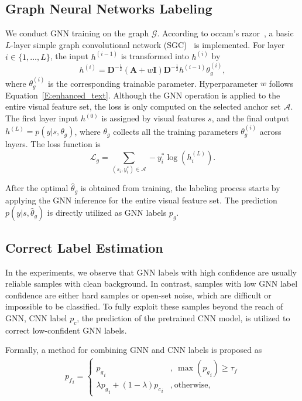 \documentclass[sigconf]{acmart}
\begin{document}
	\subsection{Graph Neural Networks Labeling}
	\label{S:gnn}
	We conduct GNN training on the graph $\mathcal{G}$. According to occam's razor~\cite{blumer1987occam}, a basic $L$-layer simple graph convolutional network (SGC)~\cite{wu2019simplifying} is implemented. For layer $i\in \{1,\dots, L\}$, the input $h^{(i-1)}$ is transformed into $h^{(i)}$ by
	\begin{equation}
	\label{E:gnn}
	h^{(i)} = \mathbf{D}^{-\frac{1}{2}}(\mathbf{A}+w\mathbf{I})\mathbf{D}^{-\frac{1}{2}}h^{(i-1)}\theta_g^{(i)},
	\end{equation}
	where $\theta_g^{(i)}$ is the corresponding trainable parameter. Hyperparameter $w$ follows Equation~\ref{E:enhanced_text}.
    Although the GNN operation is applied to the entire visual feature set, the loss is only computed on the selected anchor set $\mathcal{A}$. The first layer input $h^{(0)}$ is assigned by visual features $s$, and the final output $h^{(L)}=p(y|s,\theta_g)$, where $\theta_g$ collects all the training parameters $\theta_g^{(i)}$ across layers. The loss function is
	\begin{equation}
	\label{E:gnn_loss}
	\mathcal{L}_{g}=\sum_{(s_i,y^*_i)\in \mathcal{A}}-y^*_i\log\left(h^{(L)}_i\right).
	\end{equation}
	
	After the optimal $\hat{\theta}_g$ is obtained from training, the labeling process starts by applying the GNN inference for the entire visual feature set. The prediction $p(y|s,\hat{\theta}_g)$ is directly utilized as GNN labels $p_g$.
	
	\subsection{Correct Label Estimation}
	\label{S:final-label}
	In the experiments, we observe that GNN labels with high confidence are usually reliable samples with clean background.
In contrast, samples with low GNN label confidence are either hard samples or open-set noise, which are difficult or impossible to be classified. To fully exploit these samples beyond the reach of GNN, CNN label $p_c$, the prediction of the pretrained CNN model, is utilized to correct low-confident GNN labels.
    
    Formally, a method for combining GNN and CNN labels is proposed as
\begin{equation}
	\label{E:combination}
	\begin{aligned}
	{p_f}_i = 
	\begin{cases}
    {p_g}_i & ,~ \max({p_g}_i)\ge\tau_f\\
	\lambda {p_g}_i + (1-\lambda){p_c}_i & ,~ \text{otherwise,}
	\end{cases}
	\end{aligned}
	\end{equation}
	
\end{document}
